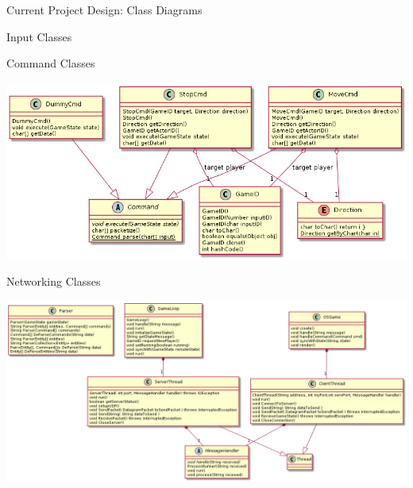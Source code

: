 \documentclass[12pt]{report}
\begin{document}
\begin{chapter}{Current Project Design: Class Diagrams}
\begin{section}{Input Classes}
   \end{section}
   \begin{section}{Command Classes}
   	\centerline{\includegraphics[width=\textwidth,height=\textheight,keepaspectratio]{./images/commandClasses.png}}
   \end{section}
   \begin{section}{Networking Classes}
   	\centerline{\includegraphics[width=\textwidth,height=\textheight,keepaspectratio]{./images/networkingClasses.png}}
   \end{section}
 \end{chapter}
\end{document}
